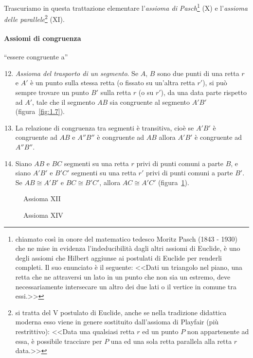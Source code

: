 \osservazione Trascuriamo in questa trattazione elementare l'\emph{assioma di Pasch}\footnote{chiamato così in onore del matematico tedesco Moritz Pasch (1843 - 1930) che ne mise in evidenza l'indeducibilità dagli altri assiomi di Euclide, è uno degli assiomi che Hilbert aggiunse ai postulati di Euclide per renderli completi. Il suo enunciato è il seguente: <<Dati un triangolo nel piano, una retta che ne attraversi un lato in un punto che non sia un estremo, deve necessariamente intersecare un altro dei due lati o il vertice in comune tra essi.>>} (X) e l'\emph{assioma delle parallele}\footnote{si tratta del V postulato di Euclide, anche se nella tradizione didattica moderna esso viene in genere sostituito dall'assioma di Playfair (più restrittivo): <<Data una qualsiasi retta $r$ ed un punto $P$ non appartenente ad essa, è possibile tracciare per $P$ una ed una sola retta parallela alla retta $r$ data.>>} (XI).

\paragraph{Assiomi di congruenza} ``essere congruente a''
\begin{enumerate}[label=\Roman{*}.]
\setcounter{enumi}{11}
\item \emph{Assioma del trasporto di un segmento}. Se $A$, $B$ sono due punti di una retta $r$ e $A'$ è un punto sulla stessa retta (o fissato su un'altra retta $r'$), si può sempre trovare un punto $B'$ sulla retta $r$ (o su $r'$), da una data parte rispetto ad $A'$, tale che il segmento $AB$ sia congruente al segmento $A'B'$ (figura~\ref{fig:1.7}).
\item La relazione di congruenza tra segmenti è transitiva, cioè se $A'B'$ è congruente ad $AB$ e $A''B''$ è congruente ad $AB$ allora $A'B'$ è congruente ad $A''B''$.
\item Siano $AB$ e $BC$ segmenti su una retta $r$ privi di punti comuni a parte $B$, e siano $A'B'$ e $B'C'$ segmenti su una retta $r'$ privi di punti comuni a parte $B'$. Se $AB\cong A'B'$ e $BC\cong B'C'$, allora  $AC\cong A'C'$ (figura~\ref{fig:1.8}).
\end{enumerate}

\begin{figure}[htb]
 \begin{minipage}[b]{.5\textwidth}
 \centering
 
 \caption{Assioma XII}\label{fig:1.7}
 \end{minipage}
 \begin{minipage}[b]{.5\textwidth}
 \centering
 
 \caption{Assioma XIV}\label{fig:1.8}
 \end{minipage}
\end{figure}

